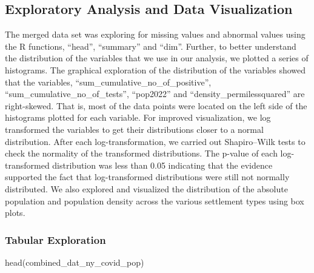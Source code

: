 \documentclass[
  12pt,
]{article}
\newenvironment{Shaded}{\begin{snugshade}}{\end{snugshade}}
\newcommand{\FunctionTok}[1]{\textcolor[rgb]{0.00,0.00,0.00}{#1}}
\newcommand{\NormalTok}[1]{#1}
\begin{document}
\newpage

\hypertarget{exploratory-analysis-and-data-visualization}{%
\subsection{Exploratory Analysis and Data
Visualization}\label{exploratory-analysis-and-data-visualization}}

The merged data set was exploring for missing values and abnormal values
using the R functions, ``head'', ``summary'' and ``dim''. Further, to
better understand the distribution of the variables that we use in our
analysis, we plotted a series of histograms. The graphical exploration
of the distribution of the variables showed that the variables,
``sum\_cumulative\_no\_of\_positive'',
``sum\_cumulative\_no\_of\_tests'', ``pop2022'' and
``density\_permilessquared'' are right-skewed. That is, most of the data
points were located on the left side of the histograms plotted for each
variable. For improved visualization, we log transformed the variables
to get their distributions closer to a normal distribution. After each
log-transformation, we carried out Shapiro--Wilk tests to check the
normality of the transformed distributions. The p-value of each
log-transformed distribution was less than 0.05 indicating that the
evidence supported the fact that log-transformed distributions were
still not normally distributed. We also explored and visualized the
distribution of the absolute population and population density across
the various settlement types using box plots.

\hypertarget{tabular-exploration}{%
\subsubsection{Tabular Exploration}\label{tabular-exploration}}

\begin{Shaded}
\begin{Highlighting}[]
\FunctionTok{head}\NormalTok{(combined\_dat\_ny\_covid\_pop)}
\end{Highlighting}
\end{Shaded}
\end{document}
